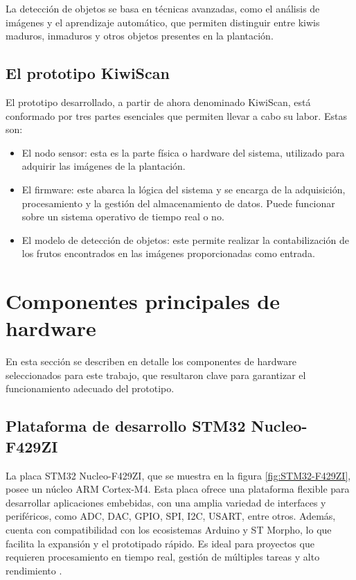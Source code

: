 La detección de objetos se basa en técnicas avanzadas, como el análisis de imágenes y el aprendizaje automático, que permiten distinguir entre kiwis maduros, inmaduros y otros objetos presentes en la plantación.

\newpage

\subsection{El prototipo KiwiScan}

El prototipo desarrollado, a partir de ahora denominado KiwiScan, está conformado por tres partes esenciales que permiten llevar a cabo su labor. Estas son:
\begin{itemize}
\item El nodo sensor: esta es la parte física o hardware del sistema, utilizado para adquirir las imágenes de la plantación.
\item El firmware: este abarca la lógica del sistema y se encarga de la adquisición, procesamiento y la gestión del almacenamiento de datos. Puede funcionar sobre un sistema operativo de tiempo real o no.
\item El modelo de detección de objetos: este permite realizar la contabilización de los frutos encontrados en las imágenes proporcionadas como entrada.
\end{itemize}

\section{Componentes principales de hardware}

En esta sección se describen en detalle los componentes de hardware seleccionados para este trabajo, que resultaron clave para garantizar el funcionamiento adecuado del prototipo.

\subsection{Plataforma de desarrollo STM32 Nucleo-F429ZI}
\label{subsec:F429ZI}

La placa STM32 Nucleo-F429ZI, que se muestra en la figura \ref{fig:STM32-F429ZI}, posee un núcleo ARM Cortex-M4. Esta placa ofrece una plataforma flexible para desarrollar aplicaciones embebidas, con una amplia variedad de interfaces y periféricos, como ADC, DAC, GPIO, SPI, I2C, USART, entre otros. Además, cuenta con compatibilidad con los ecosistemas Arduino y ST Morpho, lo que facilita la expansión y el prototipado rápido. Es ideal para proyectos que requieren procesamiento en tiempo real, gestión de múltiples tareas y alto rendimiento \citep{WEBSITE:Itt2024}.

